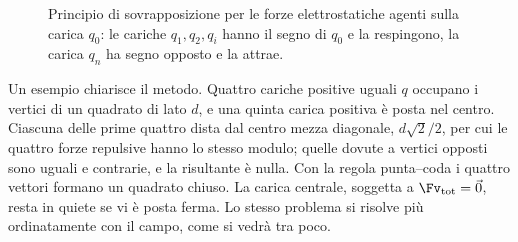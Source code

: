 \documentclass[main.tex]{subfiles}
\begin{document}
\begin{figure}[htbp]
  \caption{Principio di sovrapposizione per le forze elettrostatiche agenti sulla carica $q_0$: le cariche $q_1,q_2,q_i$ hanno il segno di $q_0$ e la respingono, la carica $q_n$ ha segno opposto e la attrae.}
  \label{fig:campo:sovrapposizione_infografica}
\end{figure}

Un esempio chiarisce il metodo. Quattro cariche positive uguali $q$ occupano i vertici di un quadrato di lato $d$, e una quinta carica positiva è posta nel centro. Ciascuna delle prime quattro dista dal centro mezza diagonale, $d\sqrt2/2$, per cui le quattro forze repulsive hanno lo stesso modulo; quelle dovute a vertici opposti sono uguali e contrarie, e la risultante è nulla. Con la regola punta--coda i quattro vettori formano un quadrato chiuso. La carica centrale, soggetta a $\Fv_{\mathrm{tot}}=\vec0$, resta in quiete se vi è posta ferma. Lo stesso problema si risolve più ordinatamente con il campo, come si vedrà tra poco.
\end{document}
